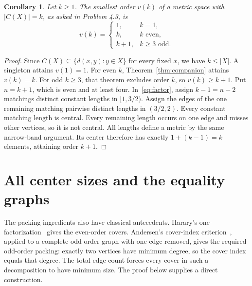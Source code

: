 \documentclass[11pt]{article}
\newtheorem{corollary}[theorem]{Corollary}
\begin{document}
\begin{corollary}\label{cor:orders}
Let $k\ge1$. The smallest order $v(k)$ of a metric space with
$|C(X)|=k$, as asked in Problem 4.3, is
\[
 v(k)=\begin{cases}
 1,&k=1,\\
 k,&k\text{ even},\\
 k+1,&k\ge3\text{ odd}.
 \end{cases}
\]
\end{corollary}
\begin{proof}
Since $C(X)\subseteq\{d(x,y):y\in X\}$ for every fixed $x$,
we have $k\le|X|$. A singleton attains $v(1)=1$.
For even $k$, Theorem~\ref{thm:companion} attains $v(k)=k$.
For odd $k\ge3$, that theorem excludes order $k$, so
$v(k)\ge k+1$. Put $n=k+1$, which is even and at least four.
In~\eqref{eq:factor}, assign $k-1=n-2$ matchings distinct constant
lengths in $[1,3/2)$. Assign the edges of the one remaining matching
pairwise distinct lengths in $(3/2,2)$. Every constant matching length
is central. Every remaining length occurs on one edge and misses
other vertices, so it is not central. All lengths define a metric
by the same narrow-band argument. Its center therefore has exactly
$1+(k-1)=k$ elements, attaining order $k+1$.
\end{proof}

\section{All center sizes and the equality graphs}
The packing ingredients also have classical antecedents. Harary's
one-factorization~\cite[Theorem 9.1]{H} gives the even-order covers.
Andersen's cover-index criterion~\cite[abstract]{A}, applied to a complete
odd-order graph with one edge removed, gives the required odd-order packing:
exactly two vertices have minimum degree, so the cover index equals that
degree. The total edge count forces every cover in such a decomposition
to have minimum size. The proof below supplies a direct construction.
\end{document}
